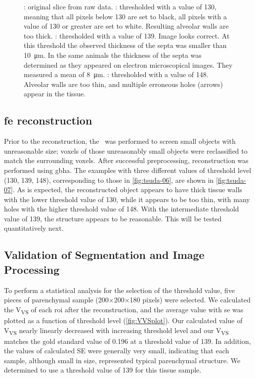 \begin{figure}[htb]
{{{				\label{subfig:tsuda-06d}%
			}%
		}%
	}%
	\caption[Thresholding Influence]{: original slice from raw data. : thresholded with a value of 130, meaning that all pixels below 130 are set to black, all pixels with a value of 130 or greater are set to white. Resulting alveolar walls are too thick. : thresholded with a value of 139. Image looks correct. At this threshold the observed thickness of the septa was smaller than \SI{10}{\micro\meter}. In the same animals \cite{Roth2005} the thickness of the septa was determined as they appeared on electron microscopical images. They measured a mean of \SI{8}{\micro\meter}. : thresholded with a value of 148. Alveolar walls are too thin, and multiple erroneous holes (arrows) appear in the tissue.}
	\label{fig:tsuda-06}
\end{figure}%

\subsection{\acs{fe} \threed reconstruction}
Prior to the \threed reconstruction, the \ was performed to screen small objects with unreasonable size; voxels of those unreasonably small objects were reclassified to match the surrounding voxels. After successful preprocessing, \threed reconstruction was performed using \ac{gbha}. The examples with three different values of threshold level (130, 139, 148), corresponding to those in \autoref{fig:tsuda-06}, are shown in \autoref{fig:tsuda-07}. As is expected, the \threed reconstructed object appears to have thick tissue walls with the lower threshold value of 130, while it appears to be too thin, with many holes with the higher threshold value of 148. With the intermediate threshold value of 139, the structure appears to be reasonable. This will be tested quantitatively next.

\subsection{Validation of Segmentation and Image Processing}
To perform a statistical analysis for the selection of the threshold value, five pieces of parenchymal sample (200$\times$200$\times$180 pixels) were selected. We calculated the V\textsubscript{VS} of each \ac{roi} after the \threed reconstruction, and the average value with \ac{se} was plotted as a function of threshold level (\autoref{fig:VVSplot}). Our calculated value of V\textsubscript{VS} nearly linearly decreased with increasing threshold level and our V\textsubscript{VS} matches the gold standard value of 0.196 at a threshold value of 139. In addition, the values of calculated SE were generally very small, indicating that each sample, although small in size, represented typical parenchymal structure. We determined to use a threshold value of 139 for this tissue sample.


